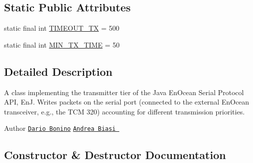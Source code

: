 \subsection*{Static Public Attributes}
\begin{DoxyCompactItemize}
\item 
static final int \hyperlink{classit_1_1polito_1_1elite_1_1enocean_1_1enj_1_1link_1_1_packet_transmitter_a24cb11c0399845b2a0f85dc1fd5e490e}{T\+I\+M\+E\+O\+U\+T\+\_\+\+TX} = 500
\item 
static final int \hyperlink{classit_1_1polito_1_1elite_1_1enocean_1_1enj_1_1link_1_1_packet_transmitter_ac6003ffc335863e2566a99792eb0f698}{M\+I\+N\+\_\+\+T\+X\+\_\+\+T\+I\+ME} = 50
\end{DoxyCompactItemize}


\subsection{Detailed Description}
A class implementing the transmitter tier of the Java En\+Ocean Serial Protocol A\+PI, EnJ. Writes packets on the serial port (connected to the external En\+Ocean transceiver, e.\+g., the T\+CM 320) accounting for different transmission priorities.

\begin{DoxyAuthor}{Author}
\href{mailto:dario.bonino@gmail.com}{\tt Dario Bonino}  \href{mailto:biasiandrea04@gmail.com}{\tt Andrea Biasi } 
\end{DoxyAuthor}


\subsection{Constructor \& Destructor Documentation}
\hypertarget{classit_1_1polito_1_1elite_1_1enocean_1_1enj_1_1link_1_1_packet_transmitter_a5299ada497832735dcdf6672677af8aa}{}\label{classit_1_1polito_1_1elite_1_1enocean_1_1enj_1_1link_1_1_packet_transmitter_a5299ada497832735dcdf6672677af8aa} 
